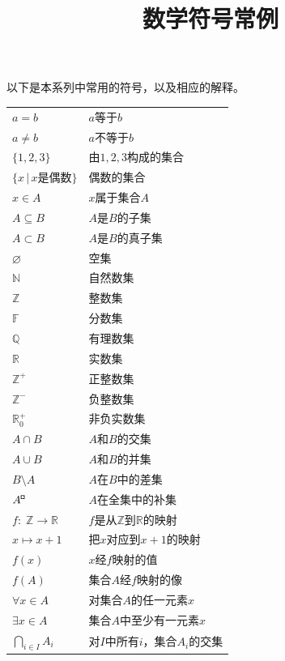 \documentclass[12pt,UTF8]{article}
\title{\zihao{0} \bfseries 数学符号常例}
\date{}
\begin{document}
\maketitle

以下是本系列中常用的符号，以及相应的解释。

\vspace{18pt}

\setlength{\extrarowheight}{3pt}
\begin{longtable}{ m{15em} m{15em} }
    $a = b$ & $a$等于$b$ \\
    $a \neq b$ & $a$不等于$b$ \\
    $\{1,2,3\}$ & 由$1,2,3$构成的集合 \\ 
    $\{x \, | \, x\mbox{是偶数}\}$ & 偶数的集合 \\  
    $x\in A$ & $x$属于集合$A$ \\
    $A \subseteq B$ & $A$是$B$的子集 \\
    $A \subset B$ & $A$是$B$的真子集 \\
    $\varnothing$ & 空集 \\
    $\mathbb{N}$ & 自然数集 \\
    $\mathbb{Z}$ & 整数集 \\
    $\mathbb{F}$ & 分数集 \\
    $\mathbb{Q}$ & 有理数集 \\
    $\mathbb{R}$ & 实数集 \\
    $\mathbb{Z}^+$ & 正整数集 \\
    $\mathbb{Z}^-$ & 负整数集 \\
    $\mathbb{R}_0^+$ & 非负实数集 \\
    $A\cap B$ & $A$和$B$的交集 \\
    $A\cup B$ & $A$和$B$的并集 \\
    $B\setminus A$ & $A$在$B$中的差集 \\
    $A^{\bu}$ & $A$在全集中的补集 \\
    $f:\; \mathbb{Z} \rightarrow \mathbb{R}$ & $f$是从$\mathbb{Z}$到$\mathbb{R}$的映射 \\
    $x\mapsto x+1$ & 把$x$对应到$x+1$的映射 \\
    $f(x)$ & $x$经$f$映射的值 \\
    $f(A)$ & 集合$A$经$f$映射的像 \\
    $\forall x \in A$ & 对集合$A$的任一元素$x$ \\
    $\exists x \in A$ & 集合$A$中至少有一元素$x$ \\
    $\displaystyle\bigcap_{i\in I} A_i$ & 对$I$中所有$i$，集合$A_i$的交集 \\

\end{longtable}
\end{document}

